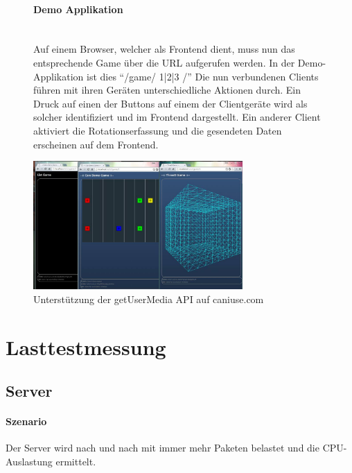\documentclass[a4paper]{spie}  %
\begin{document}
\begin{figure}[H]
\begin{minipage}[t]{0.4\textwidth}
\vspace{0pt}
\paragraph{Demo Applikation}\mbox{}\\
Auf einem Browser, welcher als Frontend dient, muss nun das entsprechende Game über die URL aufgerufen werden. In der Demo-Applikation ist dies \enquote{/game/ 1|2|3 /}
Die nun verbundenen Clients führen mit ihren Geräten unterschiedliche Aktionen durch. Ein Druck auf einen der Buttons auf einem der Clientgeräte wird als solcher identifiziert und im Frontend dargestellt. Ein anderer Client aktiviert die Rotationserfassung und die gesendeten Daten erscheinen auf dem Frontend.

\end{minipage}
\hfill
\begin{minipage}[t]{0.5\textwidth}
\vspace{0pt}
    \includegraphics[width=8cm]{images/demoGames}
     \caption{Unterstützung der getUserMedia API auf caniuse.com}
		\label{fig:test2}
\end{minipage}
\end{figure}

\section{Lasttestmessung}\label{Lasttestmessung} %

\subsection{Server}

\paragraph{Szenario} 
Der Server wird nach und nach mit immer mehr Paketen belastet und die CPU-Auslastung ermittelt.
\end{document}
